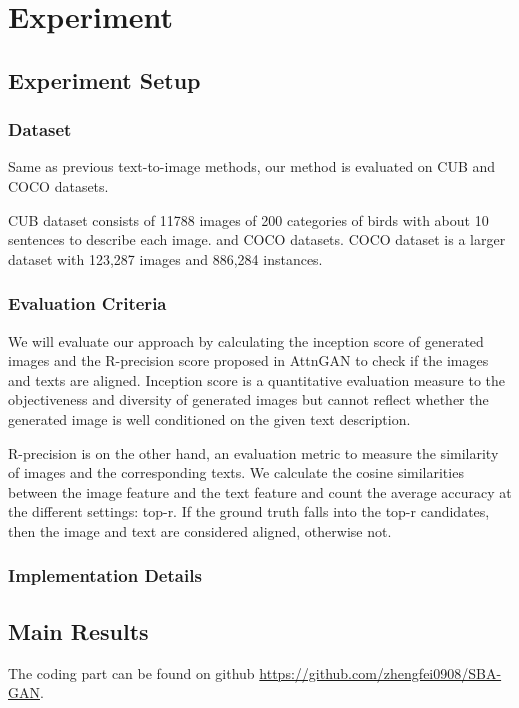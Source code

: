 \documentclass{article}
\begin{document}
\section{Experiment}
\subsection{Experiment Setup}
\subsubsection{Dataset}
Same as previous text-to-image methods\cite{attngan,mirrorgan}, our method is evaluated on CUB \cite{WahCUB_200_2011} and COCO\cite{coco} datasets.

CUB dataset consists of 11788 images of 200 categories of birds with about 10 sentences to describe each image. 
and COCO\cite{coco} datasets. COCO dataset is a larger dataset with 123,287 images and 886,284 instances.

\subsubsection{Evaluation Criteria}

We will evaluate our approach by calculating the inception score\cite{inception} of generated images and the R-precision score proposed in AttnGAN \cite{attngan} to check if the images and texts are aligned.
Inception score is a quantitative evaluation measure to the objectiveness and diversity of generated images but cannot reflect whether the generated image is well conditioned on the given text description. 

R-precision is on the other hand, an evaluation metric to measure the similarity of images and the corresponding texts. We calculate the cosine similarities between the image feature and the text feature and count the average accuracy at the different settings: top-r. If the ground truth falls into the top-r candidates, then the image and text are considered aligned, otherwise not.

\subsubsection{Implementation Details}
\subsection{Main Results}
The coding part can be found on github \href{https://github.com/zhengfei0908/SBA-GAN}{https://github.com/zhengfei0908/SBA-GAN}.
\end{document}
